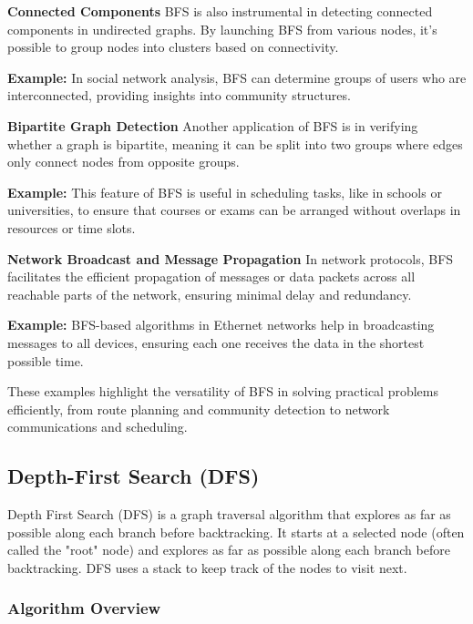 \documentclass[12pt]{book} %
\begin{document}
\textbf{Connected Components}
BFS is also instrumental in detecting connected components in undirected graphs. By launching BFS from various nodes, it's possible to group nodes into clusters based on connectivity.

\textbf{Example:} In social network analysis, BFS can determine groups of users who are interconnected, providing insights into community structures.

\textbf{Bipartite Graph Detection}
Another application of BFS is in verifying whether a graph is bipartite, meaning it can be split into two groups where edges only connect nodes from opposite groups.

\textbf{Example:} This feature of BFS is useful in scheduling tasks, like in schools or universities, to ensure that courses or exams can be arranged without overlaps in resources or time slots.

\textbf{Network Broadcast and Message Propagation}
In network protocols, BFS facilitates the efficient propagation of messages or data packets across all reachable parts of the network, ensuring minimal delay and redundancy.

\textbf{Example:} BFS-based algorithms in Ethernet networks help in broadcasting messages to all devices, ensuring each one receives the data in the shortest possible time.

These examples highlight the versatility of BFS in solving practical problems efficiently, from route planning and community detection to network communications and scheduling.


\subsection{Depth-First Search (DFS)}

Depth First Search (DFS) is a graph traversal algorithm that explores as far as possible along each branch before backtracking. It starts at a selected node (often called the "root" node) and explores as far as possible along each branch before backtracking. DFS uses a stack to keep track of the nodes to visit next.

\subsubsection{Algorithm Overview}
\end{document}
